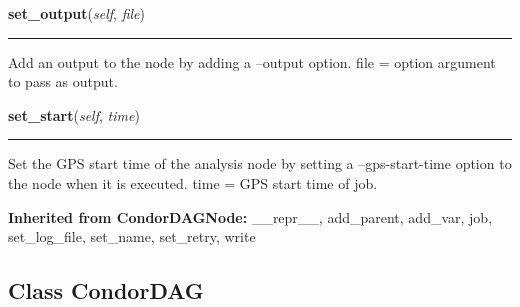     \label{pipeline:AnalysisNode:set_output}
    \vspace{0.5ex}

    \noindent\begin{boxedminipage}{\textwidth}

    \raggedright \textbf{set\_output}(\textit{self}, \textit{file})

    \vspace{-1.5ex}

    \rule{\textwidth}{0.5\fboxrule}
    Add an output to the node by adding a --output option. file = option 
    argument to pass as output.

    \vspace{1ex}

    \end{boxedminipage}

    \label{pipeline:AnalysisNode:set_start}
    \vspace{0.5ex}

    \noindent\begin{boxedminipage}{\textwidth}

    \raggedright \textbf{set\_start}(\textit{self}, \textit{time})

    \vspace{-1.5ex}

    \rule{\textwidth}{0.5\fboxrule}
    Set the GPS start time of the analysis node by setting a 
    --gps-start-time option to the node when it is executed. time = GPS 
    start time of job.

    \vspace{1ex}

    \end{boxedminipage}

  \textbf{Inherited from CondorDAGNode:}
    \_\_repr\_\_,
    add\_parent,
    add\_var,
    job,
    set\_log\_file,
    set\_name,
    set\_retry,
    write


\subsection{Class CondorDAG}

